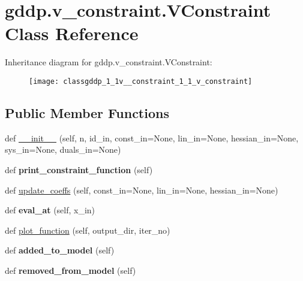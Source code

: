 \hypertarget{classgddp_1_1v__constraint_1_1_v_constraint}{}\section{gddp.\+v\+\_\+constraint.\+V\+Constraint Class Reference}
\label{classgddp_1_1v__constraint_1_1_v_constraint}
Inheritance diagram for gddp.\+v\+\_\+constraint.\+V\+Constraint\+:\begin{figure}[H]
\begin{center}
\leavevmode
\texttt{[image: classgddp\_1\_1v\_\_constraint\_1\_1\_v\_constraint]}
\end{center}
\end{figure}
\subsection*{Public Member Functions}
\begin{DoxyCompactItemize}
\item 
def \mbox{\hyperlink{classgddp_1_1v__constraint_1_1_v_constraint_a9a4aa84e529efa6fea7170e47d17cf0c}{\+\_\+\+\_\+init\+\_\+\+\_\+}} (self, n, id\+\_\+in, const\+\_\+in=None, lin\+\_\+in=None, hessian\+\_\+in=None, sys\+\_\+in=None, duals\+\_\+in=None)
\item 
\mbox{\label{classgddp_1_1v__constraint_1_1_v_constraint_a25d0767235ff9efbe59118d63c5057f0}} 
def {\bfseries print\+\_\+constraint\+\_\+function} (self)
\item 
def \mbox{\hyperlink{classgddp_1_1v__constraint_1_1_v_constraint_ab77b4159e16244c9f999b0c3e622181d}{update\+\_\+coeffs}} (self, const\+\_\+in=None, lin\+\_\+in=None, hessian\+\_\+in=None)
\item 
\mbox{\label{classgddp_1_1v__constraint_1_1_v_constraint_a902de24779c1ad65f4f7e236800214b4}} 
def {\bfseries eval\+\_\+at} (self, x\+\_\+in)
\item 
def \mbox{\hyperlink{classgddp_1_1v__constraint_1_1_v_constraint_a69113e1dad8edbb6e7b0c34923014a20}{plot\+\_\+function}} (self, output\+\_\+dir, iter\+\_\+no)
\item 
\mbox{\label{classgddp_1_1v__constraint_1_1_v_constraint_a025e12cac2335edcb01cf300ff541c7c}} 
def {\bfseries added\+\_\+to\+\_\+model} (self)
\item 
\mbox{\label{classgddp_1_1v__constraint_1_1_v_constraint_a6696e6efc6f767899325405312aa6845}} 
def {\bfseries removed\+\_\+from\+\_\+model} (self)
\end{DoxyCompactItemize}

